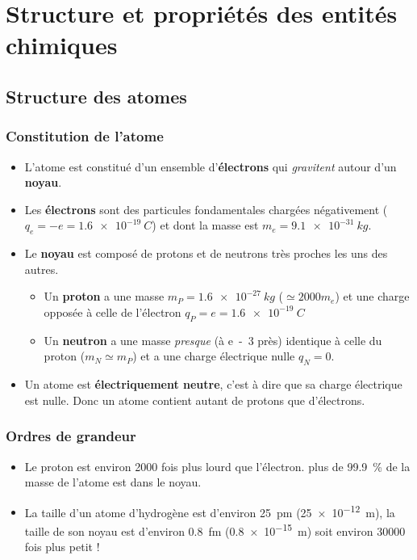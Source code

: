 \documentclass{cours}
\begin{document}
\chapter{Structure et propriétés des entités chimiques}

\section{Structure des atomes}%
\label{sec:structure_des_atomes}

\subsection{Constitution de l'atome}%
\label{sub:constitution_de_l_atome}
\begin{itemize}
	\item L'atome est constitué d'un ensemble d'\textbf{électrons} qui
	      \textit{gravitent} autour d'un \textbf{noyau}.
	\item Les \textbf{électrons} sont des particules fondamentales chargées
	      négativement ($q_e=-e=\SI{1.6e-19}{C}$) et dont la masse est
	      $m_e=\SI{9.1e-31}{kg}$.
	\item Le \textbf{noyau} est composé de protons et de neutrons très proches les
	      uns des autres.
	      \begin{itemize}
		      \item Un \textbf{proton} a une masse $m_P=\SI{1.6e-27}{kg}$ ($\simeq 2000 m_e$)
		            et une charge opposée à celle de l'électron $q_P=e=\SI{1.6e-19}{C}$
		      \item Un \textbf{neutron} a une masse \emph{presque} (à \si{e-3} près)
		            identique à celle du proton ($m_N\simeq m_P$) et a une charge électrique nulle
		            $q_N=0$.
	      \end{itemize}
	\item Un atome est \textbf{électriquement neutre}, c'est à dire que sa charge
	      électrique est nulle. Donc un atome contient autant de protons que d'électrons.
\end{itemize}

\subsection{Ordres de grandeur}%
\label{sub:ordres_de_grandeur}

\begin{itemize}
	\item Le proton est environ 2000 fois plus lourd que l'électron. plus de
	      \SI{99.9}{\percent} de la masse de l'atome est dans le noyau.

	\item La taille d'un atome d'hydrogène est d'environ \SI{25}{pm}
	      (\SI{25e-12}{m}), la taille de son noyau est d'environ \SI{0.8}{fm}
	      (\SI{0.8e-15}{m}) soit environ 30000 fois plus petit !
\end{itemize}
\end{document}
